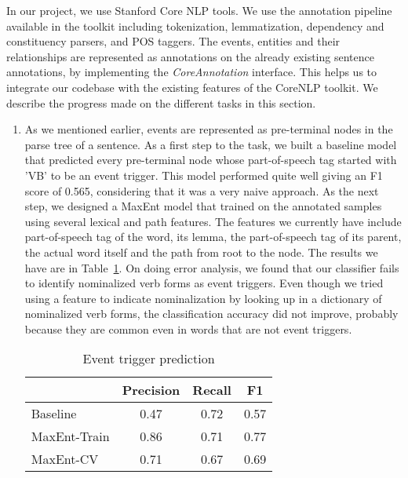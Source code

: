 In our project, we use Stanford Core NLP tools. We use the annotation pipeline available in the toolkit including tokenization, lemmatization, dependency and constituency parsers, and POS taggers. The events, entities and their relationships are represented as annotations on the already existing sentence annotations, by implementing the {\em CoreAnnotation} interface. This helps us to integrate our codebase with the existing features of the CoreNLP toolkit. We describe the progress made on the different tasks in this section.

\begin{enumerate}

\item {} As we mentioned earlier, events are represented as pre-terminal nodes in the parse tree of a sentence. As a first step to the task, we built a baseline model that predicted every pre-terminal node whose part-of-speech tag started with 'VB' to be an event trigger. This model performed quite well giving an F1 score of 0.565, considering that it was a very naive approach. As the next step, we designed a MaxEnt model that trained on the annotated samples using several lexical and path features. The features we currently have include part-of-speech tag of the word, its lemma, the part-of-speech tag of its parent, the actual word itself and the path from root to the node. The results we have are in Table~\ref{table:eventprediction}. On doing error analysis, we found that our classifier fails to identify nominalized verb forms as event triggers. Even though we tried using a feature to indicate nominalization by looking up in a dictionary of nominalized verb forms, the classification accuracy did not improve, probably because they are common even in words that are not event triggers.

\begin{table}
\centering
\begin{tabular}{|l||c|c|c|} \hline
&\textbf{Precision} & \textbf{Recall} & \textbf{F1} \\ \hline
\hline
Baseline& 0.47 & 0.72&0.57\\
MaxEnt-Train& 0.86 & 0.71&  0.77 \\
MaxEnt-CV&0.71&0.67&0.69\\
\hline
\end{tabular}
\caption{Event trigger prediction}
\label{table:eventprediction}
\end{table}


\end{enumerate}
